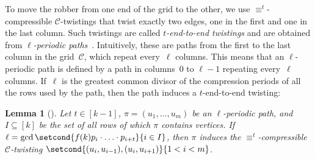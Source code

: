 \documentclass[10pt,a4paper]{article}
\newcommand{\defining}[1]{\emph{#1}}
\newcommand{\comp}{\equiv}
\newcommand{\grid}{\mathcal{C}}
\newtheorem{lemma}[theorem]{Lemma}
\begin{document}
To move the robber from one end of the grid to the other,
we use $\comp^t$\nobreakdash-compressible $\grid$\nobreakdash-twistings that twist exactly two edges, one in the first and one in the last column.
Such twistings are called \defining{$t$-end-to-end twistings} and are obtained from
%
\defining{$\ell$-periodic paths}~\cite{DBLP:conf/focs/GroheLNS23}.
Intuitively, these are paths from the first to the last column in the grid~$\grid$, which repeat every~$\ell$ columns. This means that an $\ell$-periodic path is defined by a path in columns~$0$ to $\ell-1$ repeating every~$\ell$ columns.
If~$\ell$ is the greatest common divisor of the compression periods of all the rows used by the path, then the path induces a $t$-end-to-end twisting:

\begin{lemma}[\cite{RFJN024,DBLP:conf/focs/GroheLNS23}]
        \label{lem:periodic-paths-to-twistings}
        Let $t \in [k-1]$, $\pi=(u_1,\dots,u_m)$ be an $\ell$-periodic path,
        and $I \subseteq[k]$ be the set of all rows
        of which $\pi$ contains vertices.
        If $\ell = \gcd \setcond{f(k)p_i\cdot \ldots \cdot p_{i+t}}{i \in I}$,
        then $\pi$ induces the $\comp^t$-compressible $\grid$-twisting
        $\setcond{(u_i, u_{i-1}), (u_i,u_{i+1})}{1<i<m}$.
        
\end{lemma}
\end{document}

